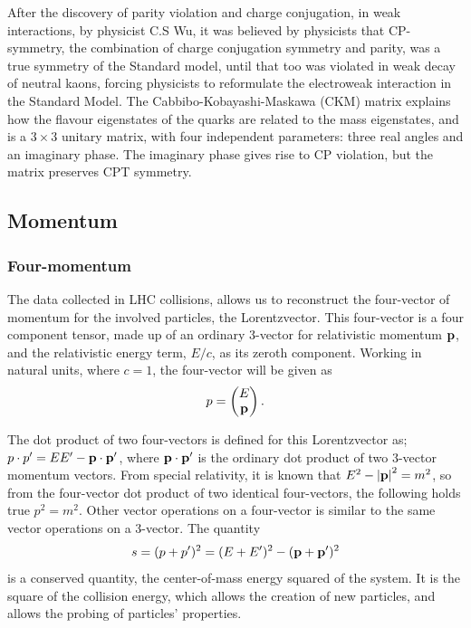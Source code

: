 \documentclass[12pt,a4paper]{article}
\numberwithin{equation}{section}
\begin{document}
After the discovery of parity violation and charge conjugation, in weak
interactions, by physicist C.S Wu\cite{PhysRev.105.1413}, it was believed by
physicists that CP-symmetry, the combination of charge conjugation symmetry and
parity, was a true symmetry of the Standard model, until that too was violated
in weak decay of neutral kaons, forcing physicists to reformulate the
electroweak interaction in the Standard Model. The Cabbibo-Kobayashi-Maskawa
(CKM) matrix explains how the flavour eigenstates of the quarks are related to
the mass eigenstates, and is a $3 \times 3$ unitary matrix, with four independent
parameters: three real angles and an imaginary phase\cite[153]{Povh2015}. The
imaginary phase gives rise to CP violation, but the matrix preserves CPT
symmetry.

\subsection{Momentum}\label{sec:momentum}

\subsubsection{Four-momentum}
The data collected in LHC collisions, allows us to reconstruct the four-vector of
momentum for the involved particles, the Lorentzvector. This four-vector is a four
component tensor, made up of an ordinary 3-vector for relativistic momentum
$\vb p$, and the relativistic energy term, $E/c$, as its zeroth component.
Working in natural units, where $c=1$, the four-vector will be given as
\begin{equation}
p = \left(\begin{matrix} E \\ \vb p \end{matrix} \right).
\end{equation}

The dot product of two four-vectors is defined for this Lorentzvector as;
$p\cdot p' = E E' - \vb p \cdot \vb{p'}$, where $\vb p \cdot \vb{p'}$ is the ordinary dot
product of two 3-vector momentum vectors. From special relativity, it is known
that $E^2 - \abs{\vb p}^2 = m^2$, so from the four-vector dot product of two
identical four-vectors, the following holds true $p^2 = m^2$. Other vector
operations on a four-vector is similar to the same vector operations on a
3-vector. The quantity
\begin{equation}
s = (p + p')^2 = (E + E')^2 - (\vb p + \vb p')^2
\end{equation}
is a conserved quantity, the center-of-mass energy squared of the system. It is
the square of the collision energy, which allows the creation of new particles,
and allows the probing of particles' properties.
\end{document}
